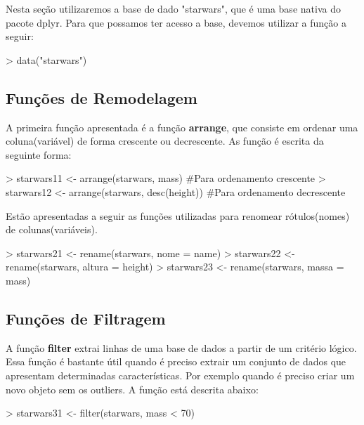 \documentclass[12pt,a4paper,oneside]{erdc}
\begin{document}
  Nesta seção utilizaremos a base de dado "starwars", que é uma base nativa do pacote dplyr. Para que possamos ter acesso a base, devemos utilizar a função a seguir:
  
\begin{Schunk}
\begin{Sinput}
> data("starwars")
\end{Sinput}
\end{Schunk}
  
  \subsection{Funções de Remodelagem}
A primeira função apresentada é a função \textbf{arrange}, que consiste em ordenar uma coluna(variável) de forma crescente ou decrescente. As função é escrita da seguinte forma:

\begin{Schunk}
\begin{Sinput}
> starwars11 <- arrange(starwars, mass) #Para ordenamento crescente
> starwars12 <- arrange(starwars, desc(height)) #Para ordenamento decrescente
\end{Sinput}
\end{Schunk}
  
Estão apresentadas a seguir as funções utilizadas para renomear rótulos(nomes) de colunas(variáveis).

\begin{Schunk}
\begin{Sinput}
> starwars21 <- rename(starwars, nome = name)
> starwars22 <- rename(starwars, altura = height)
> starwars23 <- rename(starwars, massa = mass)
\end{Sinput}
\end{Schunk}

\subsection{Funções de Filtragem}
A função \textbf{filter} extrai linhas de uma base de dados a partir de um critério lógico. Essa função é bastante útil quando é preciso extrair um conjunto de dados que apresentam determinadas características. Por exemplo quando é preciso criar um novo objeto sem os outliers. A função está descrita abaixo:

\begin{Schunk}
\begin{Sinput}
> starwars31 <- filter(starwars, mass < 70)
\end{Sinput}
\end{Schunk}
\end{document}
